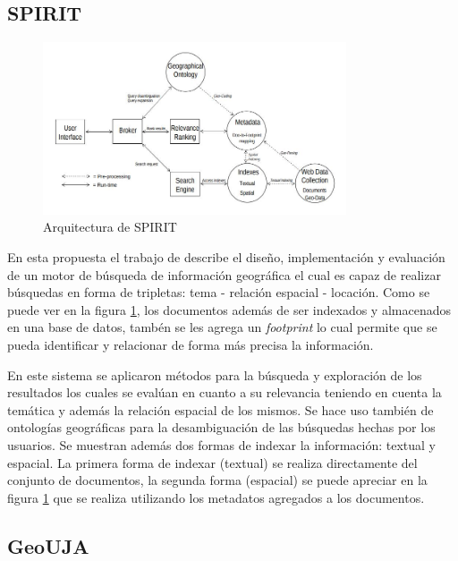 \clearpage

\subsection{SPIRIT}\label{sec:archspirit}

\begin{figure}[htb]%
	\begin{center}
		\includegraphics[width=0.8\textwidth]{spirit_arch.jpg}
	\end{center}
	\caption{Arquitectura de SPIRIT \cite{purves2007}}
	\label{fig:archspirit}
\end{figure}

En esta propuesta el trabajo de \cite{purves2007} describe el diseño,
implementación y evaluación de un motor de búsqueda de información geográfica
el cual es capaz de realizar búsquedas en forma de tripletas: tema - relación
espacial - locación. Como se puede ver en la figura \ref{fig:archspirit}, los
documentos además de ser indexados y almacenados en una base de datos, tambén
se les agrega un \emph{footprint} lo cual permite que se pueda identificar y
relacionar de forma más precisa la información.

En este sistema se aplicaron métodos para la búsqueda y exploración de los
resultados los cuales se evalúan en cuanto a su relevancia teniendo en cuenta
la temática y además la relación espacial de los mismos. Se hace uso también de
ontologías geográficas para la desambiguación de las búsquedas hechas por los
usuarios. Se muestran además dos formas de indexar la información: textual y
espacial. La primera forma de indexar (textual) se realiza directamente del
conjunto de documentos, la segunda forma (espacial) se puede apreciar en la
figura \ref{fig:archspirit} que se realiza utilizando los metadatos agregados a
los documentos.

\clearpage

\subsection{GeoUJA}\label{sec:archgeouja}


